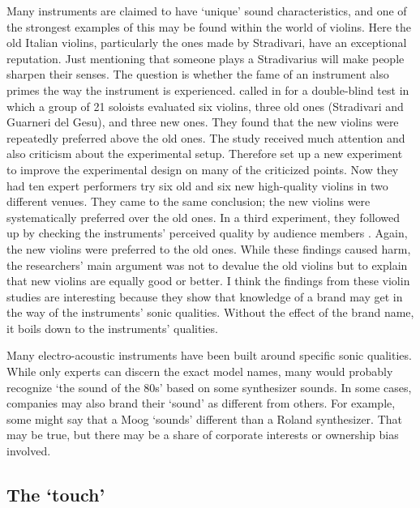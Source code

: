 Many instruments are claimed to have `unique' sound characteristics, and one of the strongest examples of this may be found within the world of violins. Here the old Italian violins, particularly the ones made by Stradivari, have an exceptional reputation. Just mentioning that someone plays a Stradivarius will make people sharpen their senses. The question is whether the fame of an instrument also primes the way the instrument is experienced. \citet{fritz_player_2012} called in for a double-blind test in which a group of 21 soloists evaluated six violins, three old ones (Stradivari and Guarneri del Gesu), and three new ones. They found that the new violins were repeatedly preferred above the old ones. The study received much attention and also criticism about the experimental setup. Therefore \citet{levitin_expert_2014} set up a new experiment to improve the experimental design on many of the criticized points. Now they had ten expert performers try six old and six new high-quality violins in two different venues. They came to the same conclusion; the new violins were systematically preferred over the old ones. In a third experiment, they followed up by checking the instruments' perceived quality by audience members \citep{fritz_listener_2017}. Again, the new violins were preferred to the old ones. While these findings caused harm, the researchers' main argument was not to devalue the old violins but to explain that new violins are equally good or better.
I think the findings from these violin studies are interesting because they show that knowledge of a brand may get in the way of the instruments' sonic qualities. Without the effect of the brand name, it boils down to the instruments' qualities.

Many electro-acoustic instruments have been built around specific sonic qualities. While only experts can discern the exact model names, many would probably recognize `the sound of the 80s' based on some synthesizer sounds. In some cases, companies may also brand their `sound' as different from others. For example, some might say that a Moog `sounds' different than a Roland synthesizer. That may be true, but there may be a share of corporate interests or ownership bias involved.


\subsection{The `touch'}

